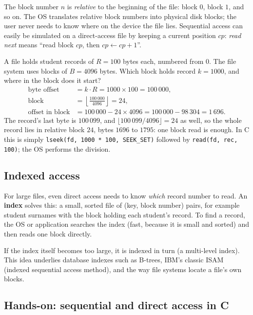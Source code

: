 \documentclass[11pt,a4paper]{article}
\newcommand{\term}[1]{\textbf{\color{mintdeep}#1}}
\newcommand{\cmd}[1]{\texttt{#1}}
\begin{document}
The block number $n$ is \emph{relative} to the beginning of the file: block $0$, block $1$, and so on. The OS translates relative block numbers into physical disk blocks; the user never needs to know where on the device the file lies. Sequential access can easily be simulated on a direct-access file by keeping a current position $cp$: \emph{read next} means ``read block $cp$, then $cp \leftarrow cp+1$''.

\begin{example}
A file holds student records of $R = 100$ bytes each, numbered from $0$. The file system uses blocks of $B = 4096$ bytes. Which block holds record $k = 1000$, and where in the block does it start?
\begin{align*}
\text{byte offset} &= k \cdot R = 1000 \times 100 = 100\,000,\\
\text{block} &= \left\lfloor \frac{100\,000}{4096} \right\rfloor = 24,\\
\text{offset in block} &= 100\,000 - 24 \times 4096 = 100\,000 - 98\,304 = 1\,696 .
\end{align*}
The record's last byte is $100\,099$, and $\lfloor 100\,099 / 4096 \rfloor = 24$ as well, so the whole record lies in relative block $24$, bytes $1696$ to $1795$: one block read is enough. In C this is simply \cmd{lseek(fd, 1000 * 100, SEEK\_SET)} followed by \cmd{read(fd, rec, 100)}; the OS performs the division.
\end{example}

\subsection{Indexed access}

For large files, even direct access needs to know \emph{which} record number to read. An \term{index} solves this: a small, sorted file of (key, block number) pairs, for example student surnames with the block holding each student's record. To find a record, the OS or application searches the index (fast, because it is small and sorted) and then reads one block directly.


If the index itself becomes too large, it is indexed in turn (a multi-level index). This idea underlies database indexes such as B-trees, IBM's classic ISAM (indexed sequential access method), and the way file systems locate a file's own blocks.

\subsection{Hands-on: sequential and direct access in C}
\end{document}

